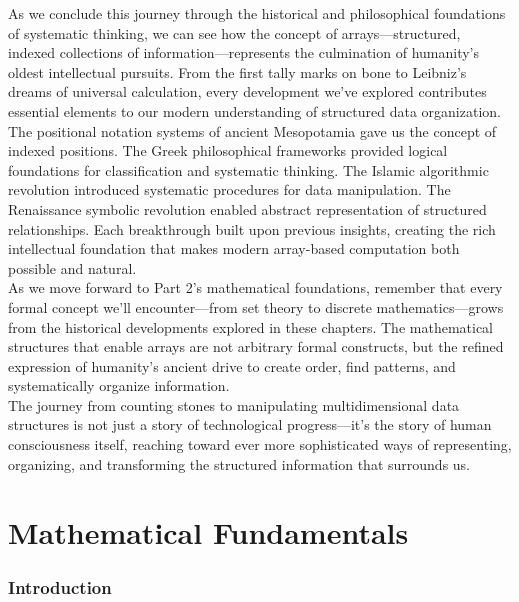 \documentclass[12pt, oneside, openany]{book}
\begin{document}
As we conclude this journey through the historical and philosophical foundations of systematic thinking, we can see how the concept of arrays—structured, indexed collections of information—represents the culmination of humanity's oldest intellectual pursuits. From the first tally marks on bone to Leibniz's dreams of universal calculation, every development we've explored contributes essential elements to our modern understanding of structured data organization.\\
The positional notation systems of ancient Mesopotamia gave us the concept of indexed positions. The Greek philosophical frameworks provided logical foundations for classification and systematic thinking. The Islamic algorithmic revolution introduced systematic procedures for data manipulation. The Renaissance symbolic revolution enabled abstract representation of structured relationships. Each breakthrough built upon previous insights, creating the rich intellectual foundation that makes modern array-based computation both possible and natural.\\
As we move forward to Part 2's mathematical foundations, remember that every formal concept we'll encounter—from set theory to discrete mathematics—grows from the historical developments explored in these chapters. The mathematical structures that enable arrays are not arbitrary formal constructs, but the refined expression of humanity's ancient drive to create order, find patterns, and systematically organize information.\\
The journey from counting stones to manipulating multidimensional data structures is not just a story of technological progress—it's the story of human consciousness itself, reaching toward ever more sophisticated ways of representing, organizing, and transforming the structured information that surrounds us.
\part{Mathematical Fundamentals}
\section*{Introduction}
\end{document}
